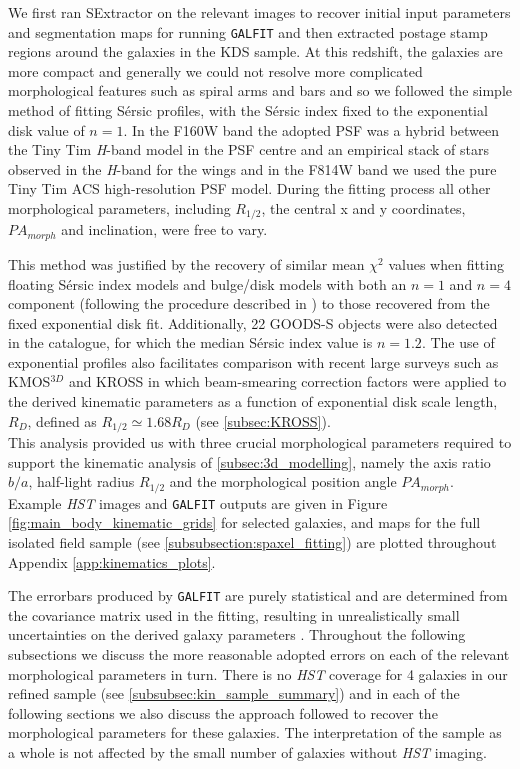 \documentclass[fleqn,usenatbib]{mnras}
\newcommand{\Sers}{S\'{e}rsic }
\begin{document}
We first ran SExtractor \citep{Bertin1996} on the relevant images to recover initial input parameters and segmentation maps for running {\tt GALFIT} and then extracted postage stamp regions around the galaxies in the KDS sample.
At this redshift, the galaxies are more compact and generally we could not resolve more complicated morphological features such as spiral arms and bars and so we followed the simple method of fitting \Sers profiles, with the \Sers index fixed to the exponential disk value of $n=1$.
In the F160W band the adopted PSF was a hybrid between the Tiny Tim {\it H}-band model \citep{Krist2011} in the PSF centre and an empirical stack of stars observed in the {\it H}-band for the wings \citep{VanderWel2012} and in the F814W band we used the pure Tiny Tim ACS high-resolution PSF model.
During the fitting process all other morphological parameters, including $R_{1/2}$, the central x and y coordinates, $PA_{morph}$ and inclination, were free to vary.

This method was justified by the recovery of similar mean $\chi^{2}$ values when fitting floating \Sers index models and bulge/disk models with both an $n=1$ and $n=4$ component (following the procedure described in \citealt{Bruce2012}) to those recovered from the fixed exponential disk fit.
Additionally, 22 GOODS-S objects were also detected in the \cite{VanderWel2012} catalogue, for which the median \Sers index value is $n=1.2$.
The use of exponential profiles also facilitates comparison with recent large surveys such as KMOS$^{3D}$ \citep{Wisnioski2015} and KROSS \citep{Harrison2017} in which beam-smearing correction factors were applied to the derived kinematic parameters as a function of exponential disk scale length, $R_{D}$, defined as $R_{1/2}\simeq1.68 R_{D}$ (see \cref{subsec:KROSS}). \\

This analysis provided us with three crucial morphological parameters required to support the kinematic analysis of \cref{subsec:3d_modelling}, namely the axis ratio $b/a$, half-light radius $R_{1/2}$ and the morphological position angle $PA_{morph}$.
Example {\em HST} images and {\tt GALFIT} outputs are given in Figure \ref{fig:main_body_kinematic_grids} for selected galaxies, and maps for the full isolated field sample (see \cref{subsubsection:spaxel_fitting}) are plotted throughout Appendix \ref{app:kinematics_plots}. 

The errorbars produced by {\tt GALFIT} are purely statistical and are determined from the covariance matrix used in the fitting, resulting in unrealistically small uncertainties on the derived galaxy parameters \citep{Hausler2007,Bruce2012}.
Throughout the following subsections we discuss the more reasonable adopted errors on each of the relevant morphological parameters in turn.
There is no {\em HST} coverage for 4 galaxies in our refined sample (see \cref{subsubsec:kin_sample_summary}) and in each of the following sections we also discuss the approach followed to recover the morphological parameters for these galaxies.
The interpretation of the sample as a whole is not affected by the small number of galaxies without {\em HST} imaging.
\end{document}
